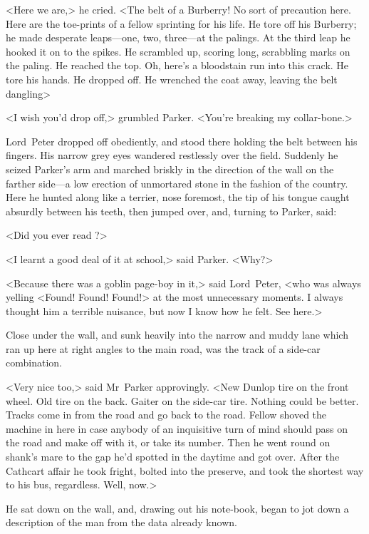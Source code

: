 <Here we are,> he cried. <The belt of a Burberry! No sort of precaution here. Here are the toe-prints of a fellow sprinting for his life. He tore off his Burberry; he made desperate leaps—one, two, three—at the palings. At the third leap he hooked it on to the spikes. He scrambled up, scoring long, scrabbling marks on the paling. He reached the top. Oh, here's a bloodstain run into this crack. He tore his hands. He dropped off. He wrenched the coat away, leaving the belt dangling\longdash>

<I wish you'd drop off,> grumbled Parker. <You're breaking my collar-bone.>

Lord~Peter dropped off obediently, and stood there holding the belt between his fingers. His narrow grey eyes wandered restlessly over the field. Suddenly he seized Parker's arm and marched briskly in the direction of the wall on the farther side—a low erection of unmortared stone in the fashion of the country. Here he hunted along like a terrier, nose foremost, the tip of his tongue caught absurdly between his teeth, then jumped over, and, turning to Parker, said:

<Did you ever read ?>

<I learnt a good deal of it at school,> said Parker. <Why?>

<Because there was a goblin page-boy in it,> said Lord~Peter, <who was always yelling <Found! Found! Found!> at the most unnecessary moments.  I always thought him a terrible nuisance, but now I know how he felt.  See here.>

Close under the wall, and sunk heavily into the narrow and muddy lane which ran up here at right angles to the main road, was the track of a side-car combination.

<Very nice too,> said Mr~Parker approvingly. <New Dunlop tire on the front wheel. Old tire on the back. Gaiter on the side-car tire.  Nothing could be better. Tracks come in from the road and go back to the road. Fellow shoved the machine in here in case anybody of an inquisitive turn of mind should pass on the road and make off with it, or take its number. Then he went round on shank's mare to the gap he'd spotted in the daytime and got over. After the Cathcart affair he took fright, bolted into the preserve, and took the shortest way to his bus, regardless. Well, now.>

He sat down on the wall, and, drawing out his note-book, began to jot down a description of the man from the data already known.

